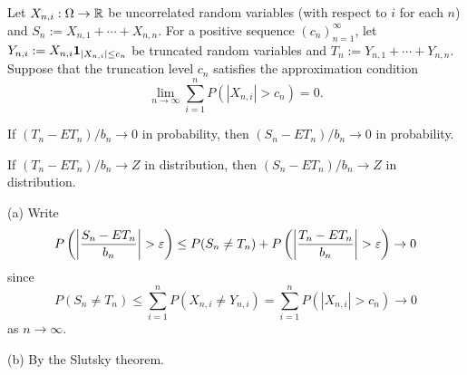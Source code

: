 \documentclass{../note}
\begin{document}
\begin{prb}
Let $X_{n,i}:\Omega\to\mathbb{R}$ be uncorrelated random variables (with respect to $i$ for each $n$) and $S_n:=X_{n,1}+\cdots+X_{n,n}$.
For a positive sequence $(c_n)_{n=1}^\infty$, let $Y_{n,i}:=X_{n,i}\mathbf{1}_{|X_{n,i}|\le c_n}$ be truncated random variables and $T_n:=Y_{n,1}+\cdots+Y_{n,n}$.
Suppose that the truncation level $c_n$ satisfies the approximation condition
\[\lim_{n\to\infty}\sum_{i=1}^nP(|X_{n,i}|>c_n)=0.\]
\begin{parts}
\item If $(T_n-ET_n)/b_n\to0$ in probability, then $(S_n-ET_n)/b_n\to0$ in probability.
\item If $(T_n-ET_n)/b_n\to Z$ in distribution, then $(S_n-ET_n)/b_n\to Z$ in distribution.
\end{parts}
\end{prb}
\begin{pf}
(a)
Write
\[P\left(\left|\frac{S_n-ET_n}{b_n}\right|>\e\right)
\le P(S_n\ne T_n)+P\left(\left|\frac{T_n-ET_n}{b_n}\right|>\e\right)\to0\]
since
\[P(S_n\ne T_n)\le\sum_{i=1}^nP(X_{n,i}\ne Y_{n,i})=\sum_{i=1}^nP(|X_{n,i}|>c_n)\to0\]
as $n\to\infty$.

(b)
By the Slutsky theorem.
\end{pf}
\end{document}
